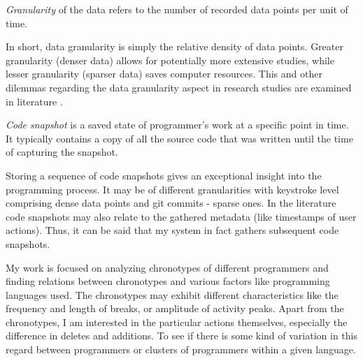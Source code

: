 \begin{definition}\label{def:granularity}
\emph{Granularity} of the data refers to the number of recorded data points per unit of time.
\end{definition}

In short, data granularity is simply the relative density of data points. Greater granularity (denser data) allows for potentially more extensive studies, while lesser granularity (sparser data) saves computer resources. This and other dilemmas regarding the data granularity aspect in research studies are examined in literature \cite{Vih14CodeSnapshotGranularity}.

\begin{definition}
\emph{Code snapshot} is a saved state of programmer's work at a specific point in time. It typically contains a copy of all the source code that was written until the time of capturing the snapshot. \cite{Jad06NoviceCompilationBehaviour}
\end{definition}

Storing a sequence of code snapshots gives an exceptional insight into the programming process. It may be of different granularities with keystroke level comprising dense data points and git commits - sparse ones. In the literature code snapshots may also relate to the gathered metadata (like timestamps of user actions). Thus, it can be said that my system in fact gathers subsequent code snapshots.

My work is focused on analyzing chronotypes of different programmers and finding relations between chronotypes and various factors like programming languages used. The chronotypes may exhibit different characteristics like the frequency and length of breaks, or amplitude of activity peaks. Apart from the chronotypes, I am interested in the particular actions themselves, especially the difference in deletes and additions. To see if there is some kind of variation in this regard between programmers or clusters of programmers within a given language.

